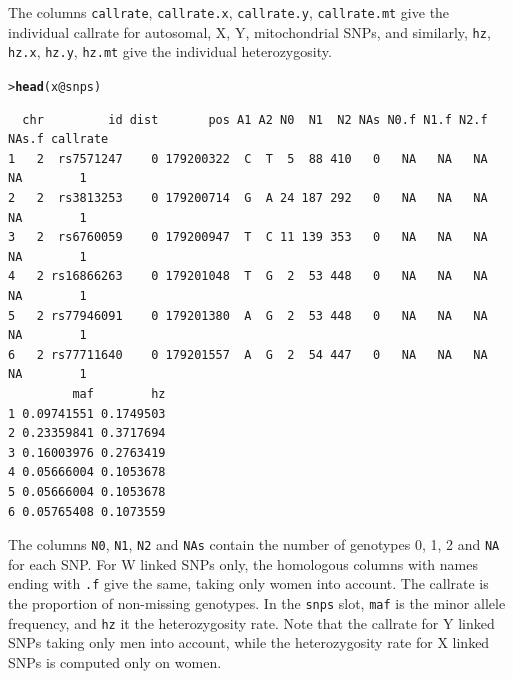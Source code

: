 \documentclass{article}\usepackage[]{graphicx}\usepackage[]{color}
\makeatletter
\newcommand{\hlopt}[1]{\textcolor[rgb]{0,0,0}{#1}}%
\newcommand{\hlstd}[1]{\textcolor[rgb]{0.345,0.345,0.345}{#1}}%
\newcommand{\hlkwc}[1]{\textcolor[rgb]{0.333,0.667,0.333}{#1}}%
\newcommand{\hlkwd}[1]{\textcolor[rgb]{0.737,0.353,0.396}{\textbf{#1}}}%
\newenvironment{kframe}{%
 \def\at@end@of@kframe{}%
 \ifinner\ifhmode%
  \def\at@end@of@kframe{\end{minipage}}%
  \begin{minipage}{\columnwidth}%
 \fi\fi%
 \def\FrameCommand##1{\hskip\@totalleftmargin \hskip-\fboxsep
 \colorbox{shadecolor}{##1}\hskip-\fboxsep
     \hskip-\linewidth \hskip-\@totalleftmargin \hskip\columnwidth}%
 \MakeFramed {\advance\hsize-\width
   \@totalleftmargin\z@ \linewidth\hsize
   \@setminipage}}%
 {\par\unskip\endMakeFramed%
 \at@end@of@kframe}
\newenvironment{knitrout}{}{} %
\makeatother
\begin{document}
The columns \verb!callrate!, \verb!callrate.x!, \verb!callrate.y!, \verb!callrate.mt!
give the individual callrate for autosomal, X, Y, mitochondrial SNPs, and similarly,
\verb!hz!, \verb!hz.x!, \verb!hz.y!, \verb!hz.mt! give the individual heterozygosity.

\begin{knitrout}
\color{fgcolor}\begin{kframe}
\begin{alltt}
\hlstd{> }\hlkwd{head}\hlstd{(x}\hlopt{@}\hlkwc{snps}\hlstd{)}
\end{alltt}
\begin{verbatim}
  chr         id dist       pos A1 A2 N0  N1  N2 NAs N0.f N1.f N2.f NAs.f callrate
1   2  rs7571247    0 179200322  C  T  5  88 410   0   NA   NA   NA    NA        1
2   2  rs3813253    0 179200714  G  A 24 187 292   0   NA   NA   NA    NA        1
3   2  rs6760059    0 179200947  T  C 11 139 353   0   NA   NA   NA    NA        1
4   2 rs16866263    0 179201048  T  G  2  53 448   0   NA   NA   NA    NA        1
5   2 rs77946091    0 179201380  A  G  2  53 448   0   NA   NA   NA    NA        1
6   2 rs77711640    0 179201557  A  G  2  54 447   0   NA   NA   NA    NA        1
         maf        hz
1 0.09741551 0.1749503
2 0.23359841 0.3717694
3 0.16003976 0.2763419
4 0.05666004 0.1053678
5 0.05666004 0.1053678
6 0.05765408 0.1073559
\end{verbatim}
\end{kframe}
\end{knitrout}

  The columns \verb!N0!, \verb!N1!, \verb!N2! and \verb!NAs! contain the number
  of genotypes 0, 1, 2 and \verb!NA! for each SNP. For W linked SNPs only, the 
  homologous columns with names ending with \verb!.f! give the same, taking only 
  women into account.
  The callrate is the proportion of non-missing
  genotypes. In the \verb!snps! slot, \verb!maf! is the minor allele frequency, and 
  \verb!hz! it the heterozygosity rate. Note that the callrate for Y linked SNPs
  taking only men into account, while the heterozygosity rate for X linked SNPs
  is computed only on women.
\end{document}
